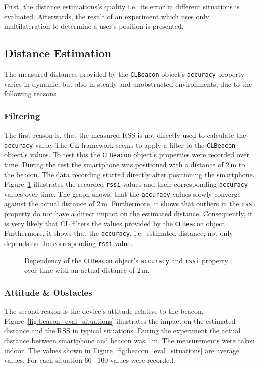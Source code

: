 First, the distance estimations's quality i.e.\ its error in different situations is evaluated. Afterwards, the result of an experiment which uses only multilateration to determine a user's position is presented.

\subsection{Distance Estimation}
The measured distances provided by the \texttt{CLBeacon} object's \texttt{accuracy} property varies in dynamic, but also in steady and unobstructed environments, due to the following reasons.

\subsubsection*{Filtering}
The first reason is, that the measured \ac{RSS} is not directly used to calculate the \texttt{accuracy} value. The \acl{CL} framework seems to apply a filter to the \texttt{CLBeacon} object's values. To test this the \texttt{CLBeacon} object's properties were recorded over time. During the test the smartphone was positioned with a distance of 2\,m to the beacon. The data recording started directly after positioning the smartphone. Figure~\ref{fig:beacon_eval_accuracy-rssi} illustrates the recorded \texttt{rssi} values and their corresponding \texttt{accuracy} values over time. The graph shows, that the \texttt{accuracy} values slowly converge against the actual distance of 2\,m. Furthermore, it shows that outliers in the \texttt{rssi} property do not have a direct impact on the estimated distance. Consequently, it is very likely that \ac{CL} filters the values provided by the \texttt{CLBeacon} object. Furthermore, it shows that the \texttt{accuracy}, i.e.\ estimated distance, not only depends on the corresponding \texttt{rssi} value.

\begin{figure}
	
	\caption {Dependency of the \texttt{CLBeacon} object's \texttt{accuracy} and \texttt{rssi} property over time with an actual distance of 2\,m.}
	\label{fig:beacon_eval_accuracy-rssi}
\end{figure}

\subsubsection*{Attitude \& Obstacles}
The second reason is the device's attitude relative to the beacon. Figure~\ref{fig:beacon_eval_situations} illustrates the impact on the estimated distance and the \ac{RSS} in typical situations.
During the experiment the actual distance between smartphone and beacon was 1\,m. The measurements were taken indoor. The values shown in Figure~\ref{fig:beacon_eval_situations} are average values. For each situation 60\,--\,100 values were recorded.\newline

